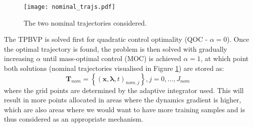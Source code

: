 \documentclass[graybox]{svmult}
\begin{document}
\begin{figure}[t]
\sidecaption
\texttt{[image: nominal\_trajs.pdf]}
\caption{The two nominal trajectories considered.}
\label{fig:nominal}
\end{figure}

The TPBVP is solved first for quadratic control optimality (QOC - $\alpha=0$). Once the optimal trajectory is found, the problem is then solved with gradually increasing $\alpha$ until mass-optimal control (MOC) is achieved $\alpha = 1$, at which point both solutions (nominal trajectories visualised in Figure \ref{fig:nominal}) are stored as:
$$
\mathbf{T}_{nom} = \left\{(\mathbf{x}, \boldsymbol{\lambda}, t)_{nom,j}\right\}, j = 0, \dots, J_{nom}
$$
where the grid points are determined by the adaptive integrator used. This will result in more points allocated in areas where the dynamics gradient is higher, which are also areas where we would want to have more training samples and is thus considered as an appropriate mechanism.
\end{document}
